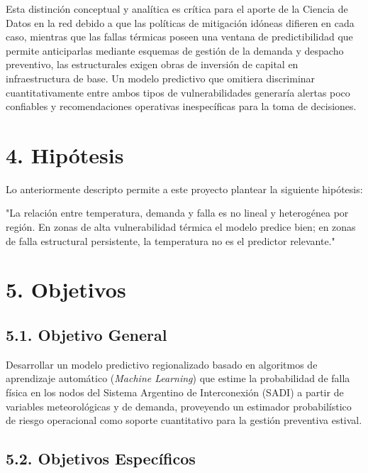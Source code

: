 Esta distinción conceptual y analítica es crítica para el aporte de la Ciencia de Datos en la red debido a que las políticas de mitigación idóneas difieren en cada caso, mientras que las fallas térmicas poseen una ventana de predictibilidad que permite anticiparlas mediante esquemas de gestión de la demanda y despacho preventivo, las estructurales exigen obras de inversión de capital en infraestructura de base. Un modelo predictivo que omitiera discriminar cuantitativamente entre ambos tipos de vulnerabilidades generaría alertas poco confiables y recomendaciones operativas inespecíficas para la toma de decisiones.

\hypertarget{hipuxf3tesis}{%
\section{4. Hipótesis}\label{hipuxf3tesis}}

Lo anteriormente descripto permite a este proyecto plantear la siguiente hipótesis:

"La relación entre temperatura, demanda y falla es no lineal y heterogénea por región. En zonas de alta vulnerabilidad térmica el modelo predice bien; en zonas de falla estructural persistente, la temperatura no es el predictor relevante."

\hypertarget{objetivos}{%
\section{5. Objetivos}\label{objetivos}}

\hypertarget{objetivo-general}{%
\subsection{5.1. Objetivo General}\label{objetivo-general}}

Desarrollar un modelo predictivo regionalizado basado en algoritmos de aprendizaje automático (\emph{Machine Learning}) que estime la probabilidad de falla física en los nodos del Sistema Argentino de Interconexión (SADI) a partir de variables meteorológicas y de demanda, proveyendo un estimador probabilístico de riesgo operacional como soporte cuantitativo para la gestión preventiva estival.

\hypertarget{objetivos-especuxedficos}{%
\subsection{5.2. Objetivos Específicos}\label{objetivos-especuxedficos}}

